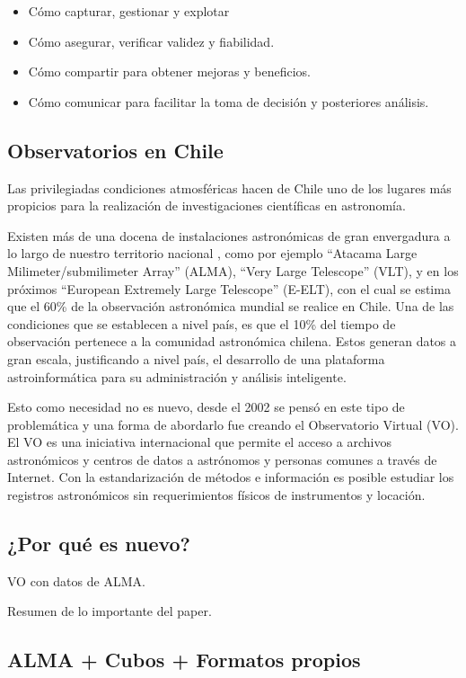 \begin{itemize}
    \item Cómo capturar, gestionar y explotar
    \item Cómo asegurar, verificar validez y fiabilidad.
    \item Cómo compartir para obtener mejoras y beneficios.
    \item Cómo comunicar para facilitar la toma de decisión y posteriores análisis.
\end{itemize}

\subsection{Observatorios en Chile}

Las privilegiadas condiciones atmosféricas hacen de Chile uno de los lugares más
propicios para la realización de investigaciones científicas en astronomía.

Existen más de una docena de instalaciones astronómicas de gran envergadura a lo
largo de nuestro territorio nacional \cite{observatorios_chile}, como por ejemplo
``Atacama Large Milimeter/submilimeter Array'' (ALMA), ``Very Large Telescope''
(VLT), y en los próximos ``European Extremely Large Telescope'' (E-ELT), con el cual
se estima que el 60\% de la observación astronómica mundial se realice en Chile.
Una de las condiciones que se establecen a nivel país, es que el 10\% del tiempo de
observación pertenece a la comunidad astronómica chilena.
Estos generan datos a gran escala, justificando a nivel país, el desarrollo de una
plataforma astroinformática para su administración y análisis inteligente.

Esto como necesidad no es nuevo, desde el 2002 se pensó en este tipo de problemática
y una forma de abordarlo fue creando el Observatorio Virtual (VO).
El VO es una iniciativa internacional que permite el acceso a archivos astronómicos
y centros de datos a astrónomos y personas comunes a través de Internet.
Con la estandarización de métodos e información es posible estudiar los registros
astronómicos sin requerimientos físicos de instrumentos y locación.

\subsection{¿Por qué es nuevo?}
VO con datos de ALMA.

Resumen de lo importante del paper.



\subsection{ALMA + Cubos + Formatos propios}
